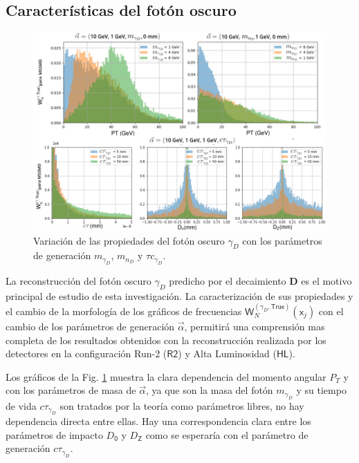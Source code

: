 \subsection{Características del fotón oscuro}
\begin{figure}[!h]
\centering
\includegraphics[width=.9\textwidth]{Cap4/imagenes/True_PT5.png}
\caption{Variación de las propiedades del fotón oscuro $\gamma_D$ con los parámetros de generación $m_{\gamma_D}$, $m_{n_D}$ y $\tau c_{\gamma_D}$.}
\label{PT_mu_True2}
\end{figure}
La reconstrucción del fotón oscuro $\gamma_D$ predicho por el decaimiento \MSSM\textbf{D} es el motivo principal de estudio de esta investigación. La caracterización de sus propiedades y el cambio de la morfología de los gráficos de frecuencias $\textsf{W}^{(\gamma_D , \textsf{True})}_N (\textsf{x}_j)$ con el cambio de los parámetros de generación $\vec{\alpha}$, permitirá una comprensión mas completa de los resultados obtenidos con la reconstrucción realizada por los detectores en la configuración Run-2 ($\textsf{R2}$) y Alta Luminosidad ($\textsf{HL}$).




Los gráficos de la Fig. \ref{PT_mu_True2} muestra la clara dependencia del momento angular $P_T$ y con los parámetros de masa de $\vec{\alpha}$, ya que son la masa del fotón $m_{\gamma_D}$ y su tiempo de vida $c\tau_{\gamma_D}$ son tratados por la teoría como parámetros libres, no hay dependencia directa entre ellas. Hay una correspondencia clara entre los parámetros de impacto $D_\textsf{0}$ y $D_\textsf{Z}$ como se esperaría con el parámetro de generación $c\tau_{\gamma_D}$.







